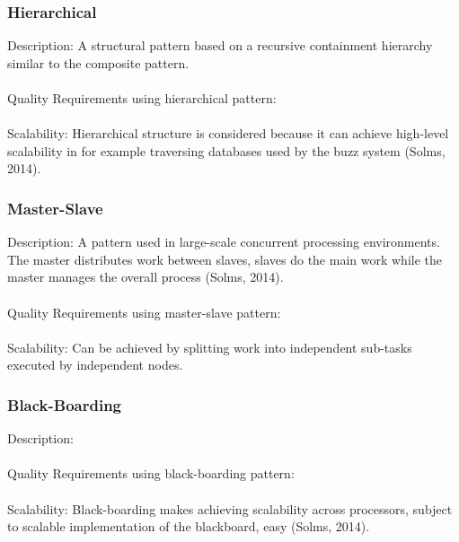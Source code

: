 \subsubsection{Hierarchical}
Description: A structural pattern based on a recursive containment hierarchy similar to the composite pattern.\\
\\
Quality Requirements using hierarchical pattern:\\
\\
Scalability: Hierarchical structure is considered because it can achieve high-level scalability in for example traversing databases used by the buzz system (Solms, 2014).\\
\subsubsection{Master-Slave}
Description: A pattern used in large-scale concurrent processing environments. The master distributes work between slaves, slaves do the main work while the master manages the  overall process (Solms, 2014). \\
\\
Quality Requirements using master-slave pattern:\\
\\
Scalability: Can be achieved by splitting work into independent sub-tasks executed by independent nodes.\\
\subsubsection{Black-Boarding}
Description:\\
\\
Quality Requirements using black-boarding pattern:\\
\\
Scalability: Black-boarding makes achieving scalability across processors, subject to scalable implementation of the blackboard, easy (Solms, 2014).\\ 